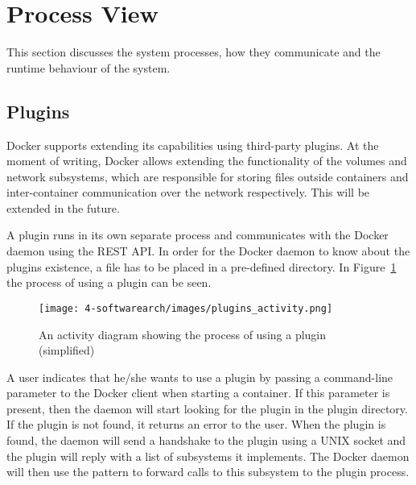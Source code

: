 
\section{Process View}
\label{sec:viewprocess}
This section discusses the system processes, how they communicate and the runtime behaviour of the system.

\subsection{Plugins}
\label{sec:processplugins}
Docker supports extending its capabilities using third-party plugins. At the moment of writing, Docker allows extending the functionality of the volumes and network subsystems, which are responsible for storing files outside containers and inter-container communication over the network respectively. This will be extended in the future\cite{dockerplugindocs}.

A plugin runs in its own separate process and communicates with the Docker daemon using the REST API. In order for the Docker daemon to know about the plugins existence, a file has to be placed in a pre-defined directory. %
In Figure~\ref{fig:activity_plugin} the process of using a plugin can be seen.
\begin{figure}[H]
\caption{An activity diagram showing the process of using a plugin (simplified)}
\centering
\texttt{[image: 4-softwarearch/images/plugins\_activity.png]}
\label{fig:activity_plugin}
\end{figure}

A user indicates that he/she wants to use a plugin by passing a command-line parameter to the Docker client when starting a container. If this parameter is present, then the daemon will start looking for the plugin in the plugin directory. If the plugin is not found, it returns an error to the user. 
When the plugin is found, the daemon will send a handshake to the plugin using a UNIX socket and the plugin will reply with a list of subsystems it implements. 
The Docker daemon will then use the  pattern to forward calls to this subsystem to the plugin process.
